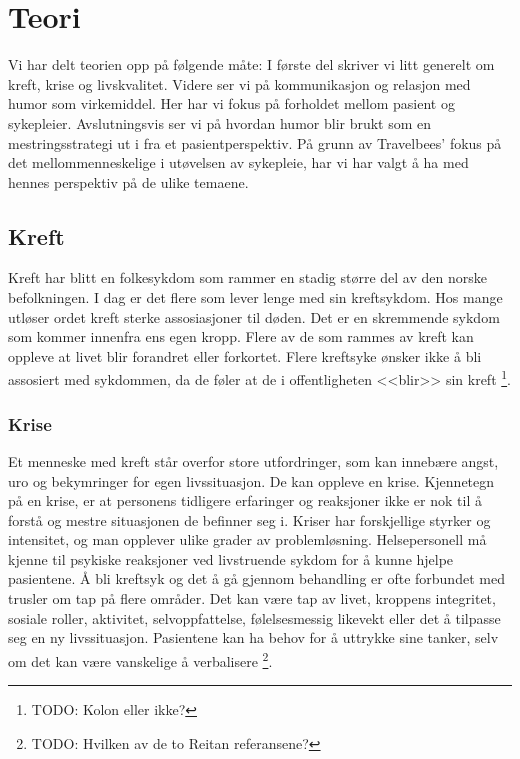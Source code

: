 \chapter{Teori}

Vi har delt teorien opp på følgende måte: I første del skriver vi litt generelt
om kreft, krise og livskvalitet. Videre ser vi på kommunikasjon og relasjon med
humor som virkemiddel. Her har vi fokus på forholdet mellom pasient og
sykepleier. Avslutningsvis ser vi på hvordan humor blir brukt som en
mestringsstrategi ut i fra et pasientperspektiv. På grunn av Travelbees' fokus
på det mellommenneskelige i utøvelsen av sykepleie, har vi har valgt å ha med
hennes perspektiv på de ulike temaene.

\section{Kreft}

Kreft har blitt en folkesykdom som rammer en stadig større del av den norske
befolkningen. I dag er det flere som lever lenge med sin kreftsykdom. Hos mange
utløser ordet kreft sterke assosiasjoner til døden. Det er en skremmende sykdom
som kommer innenfra ens egen kropp. Flere av de som rammes av kreft kan oppleve
at livet blir forandret eller forkortet. Flere kreftsyke ønsker ikke å bli
assosiert med sykdommen, da de føler at de i offentligheten <<blir>> sin kreft
\cite[s.~8--10]{amas2007}\footnote{TODO: Kolon eller ikke?}.

\subsection{Krise}

Et menneske med kreft står overfor store utfordringer, som kan innebære angst,
uro og bekymringer for egen livssituasjon. De kan oppleve en krise. Kjennetegn
på en krise, er at personens tidligere erfaringer og reaksjoner ikke er nok til
å forstå og mestre situasjonen de befinner seg i. Kriser har forskjellige
styrker og intensitet, og man opplever ulike grader av problemløsning.
Helsepersonell må kjenne til psykiske reaksjoner ved livstruende sykdom for å
kunne hjelpe pasientene. Å bli kreftsyk og det å gå gjennom behandling er ofte
forbundet med trusler om tap på flere områder. Det kan være tap av livet,
kroppens integritet, sosiale roller, aktivitet, selvoppfattelse, følelsesmessig
likevekt eller det å tilpasse seg en ny livssituasjon. Pasientene kan ha behov
for å uttrykke sine tanker, selv om det kan være vanskelige å verbalisere
\cite[s.~48--53]{reitan2008.krise}\footnote{TODO: Hvilken av de to Reitan
referansene?}.

